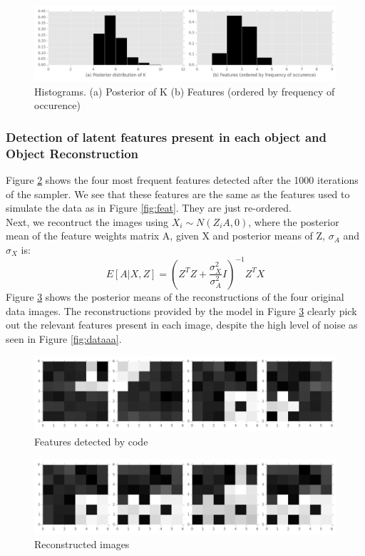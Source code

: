 \documentclass[11pt]{article}
\begin{document}
\begin{figure}
\includegraphics[width=\linewidth]{data_files/figures.png}
\caption {Histograms. (a) Posterior of K (b) Features (ordered by frequency of occurence)}
\label{fig:figur}
\end{figure}

\subsubsection{Detection of latent features present in each object and Object Reconstruction}
Figure \ref{fig:dat} shows the four most frequent features detected after the 1000 iterations of the sampler. We see that these features are the same as the features used to simulate the data as in Figure \ref{fig:feat}. They are just re-ordered.\\

Next, we recontruct the images using $X_{i} \sim N(Z_{i}A,0)$, where the posterior mean of the feature weights matrix A, given X and posterior means of Z, $\sigma_{A}$ and $\sigma_{X}$ is:
\[
E[A|X,Z] = (Z^TZ+\frac{\sigma_X^2}{\sigma_A^2}I)^{-1}Z^TX
\]
Figure \ref{fig:da} shows the posterior means of the reconstructions of the four original data images. The reconstructions provided by the model in Figure \ref{fig:da} clearly pick out the relevant features present in each image, despite the high level of noise as seen in Figure \ref{fig:dataaa}.\\

\begin{figure}
\includegraphics[width=\linewidth]{data_files/detected_features.png}
\caption {Features detected by code}
\label{fig:dat}
\end{figure}

\begin{figure}
\includegraphics[width=\linewidth]{data_files/detected_total_features.png}
\caption {Reconstructed images}
\label{fig:da}
\end{figure}
\end{document}
